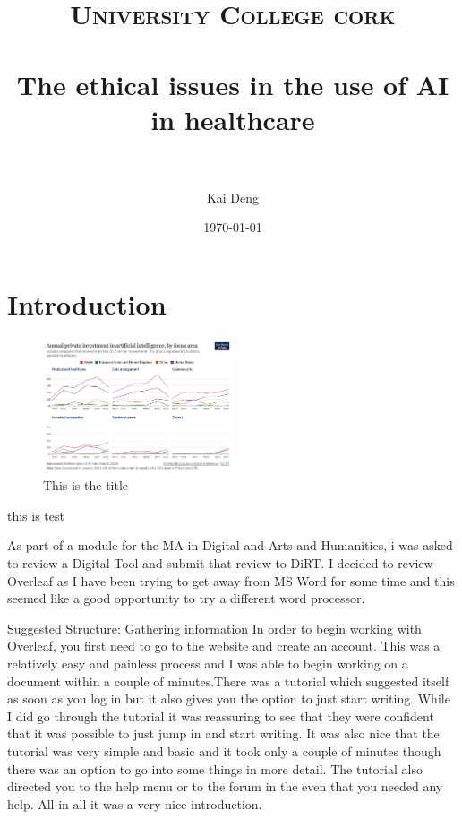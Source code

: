 \documentclass[paper=a4, fontsize=11pt]{scrartcl} %
\title{	
\normalfont \normalsize 
\textsc{University College cork} \\ [25pt] %
\horrule{0.5pt} \\[0.4cm] %
\huge The ethical issues in the use of AI in healthcare \\ %
\horrule{2pt} \\[0.5cm] %
}
\author{Kai Deng} %
\date{\normalsize\today} %
\numberwithin{equation}{section} %
\numberwithin{figure}{section} %
\numberwithin{table}{section} %
\begin{document}
\maketitle %


\section{Introduction}

\begin{figure}[h]
    \centering
    \includegraphics[width=0.5\textwidth]{./data/investegatement.png}
    \caption{This is the title}
    \label{fig:my_picture}
\end{figure}



this is test \cite{chenRethinkingAtrousConvolution2017}


As part of a module for the MA in Digital and Arts and Humanities, i was asked to review a Digital Tool and submit that review to DiRT. I decided to review Overleaf as I have been trying to get away from MS Word for some time and this seemed like a good opportunity to try a different word processor.



Suggested Structure:
Gathering information
In order to begin working with Overleaf, you first need to go to the website and create an account. This was a relatively easy and painless process and I was able to begin working on a document within a couple of minutes.There was a tutorial which suggested itself as soon as you log in but it also gives you the option to just start writing. While I did go through the tutorial it was reassuring to see that they were confident that it was possible to just jump in and start writing. It was also nice that the tutorial was very simple and basic and it took only a couple of minutes though there was an option to go into some things in more detail. The tutorial also directed you to the help menu or to the forum in the even that you needed any help. All in all it was a very nice introduction.
\end{document}
